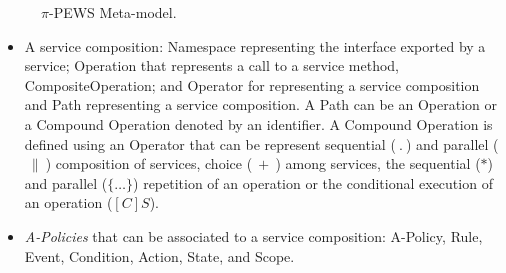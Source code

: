 \documentclass{sig-alternate}
\begin{document}
\begin{figure}
\centering
{}
\caption{$\pi$-PEWS Meta-model.}
\label{fig:metamodel}
\end{figure} 

\begin{itemize}
\item A service composition: {\sc Namespace} representing the interface exported
by a service; {\sc Operation} that represents a call to a service method, {\sc
CompositeOperation}; and  {\sc Operator} for representing a service composition
and {\sc Path} representing a service composition. A {\sc Path} can be an {\sc
Operation} or a {\sc Compound Operation} denoted by an identifier. A {\sc
Compound Operation} is defined using an  {\sc Operator}  that can be represent 
sequential ($\ . \ $) and parallel ($\ \| \ $) composition of services, choice
($\ + \ $) among services, the sequential ($*$) and parallel ($\{\dots\}$)
repetition of an operation or the conditional execution of an operation ($[C]S$).

\item {\em A-Policies} that can be associated to a service composition:  {\sc
A-Policy}, {\sc Rule}, {\sc Event}, {\sc Condition}, {\sc Action}, {\sc State},
and {\sc Scope}.
\end{itemize}
%     
\end{document}

